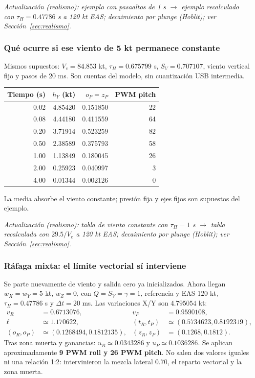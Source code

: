 \documentclass[11pt,a4paper]{article}
\begin{document}
\textit{Actualización (realismo): ejemplo con pasaaltos de 1 s $\rightarrow$ ejemplo recalculado con $\tau_H=0.47786$ s a 120 kt EAS; decaimiento por plunge (Hoblit); ver Sección~\ref{sec:realismo}.}

\subsubsection{Qué ocurre si ese viento de 5 kt permanece constante}
Mismos supuestos: $V_e=84.853$ kt, $\tau_H=0.675799$ s, $S_V=0.707107$, viento vertical fijo y pasos de 20 ms. Son cuentas del modelo, sin cuantización USB intermedia.
\begin{center}\begin{tabular}{rrrr}
\toprule Tiempo (s)&$h_Y$ (kt)&$o_P=z_P$&PWM pitch\\\midrule
0.02&4.85420&0.151850&22\\
0.08&4.44180&0.411559&64\\
0.20&3.71914&0.523259&82\\
0.50&2.38589&0.375793&58\\
1.00&1.13849&0.180045&26\\
2.00&0.25923&0.040997&3\\
4.00&0.01344&0.002126&0\\
\bottomrule\end{tabular}\end{center}
La media absorbe el viento constante; presión fija y ejes fijos son supuestos del ejemplo.

\textit{Actualización (realismo): tabla de viento constante con $\tau_H=1$ s $\rightarrow$ tabla recalculada con $29.5/V_e$ a 120 kt EAS; decaimiento por plunge (Hoblit); ver Sección~\ref{sec:realismo}.}

\subsubsection{Ráfaga mixta: el límite vectorial sí interviene}
Se parte nuevamente de viento y salida cero ya inicializados. Ahora llegan $w_X=w_Y=5$ kt, $w_Z=0$, con $Q=S_V=\gamma=1$, referencia y EAS 120 kt, $\tau_H=0.47786$ s y $\Delta t=20$ ms. Las variaciones X/Y son $4.795054$ kt:
\begin{align*}
v_R&=0.6713076,&v_P&=0.9590108,\\
\ell&\simeq1.170622,&(t_R,t_P)&\simeq(0.5734623,0.8192319),\\
(o_R,o_P)&\simeq(0.1268494,0.1812135),&
(z_R,z_P)&=(0.1268,0.1812).
\end{align*}
Tras zona muerta y ganancias: $u_R\simeq0.0343286$ y $u_P\simeq0.1036286$. Se aplican aproximadamente \textbf{9 PWM roll y 26 PWM pitch}. No salen dos valores iguales ni una relación 1:2: intervinieron la mezcla lateral 0.70, el reparto vectorial y la zona muerta.
\end{document}
